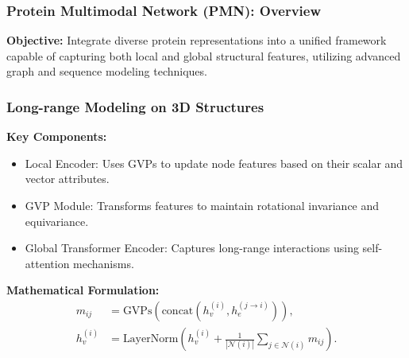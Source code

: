 \documentclass[11pt,xcolor={dvipsnames},hyperref={pdftex,pdfpagemode=UseNone,hidelinks,pdfdisplaydoctitle=true},usepdftitle=false]{beamer}
\begin{document}
\begin{frame}
    \frametitle{Protein Multimodal Network (PMN): Overview}
    \textbf{Objective:} Integrate diverse protein representations into a unified framework capable of capturing both local and global structural features, utilizing advanced graph and sequence modeling techniques.
    
    
\end{frame}

\begin{frame}
\frametitle{Long-range Modeling on 3D Structures}
\textbf{Key Components:}
\begin{itemize}
    \item Local Encoder: Uses GVPs to update node features based on their scalar and vector attributes.
    \item GVP Module: Transforms features to maintain rotational invariance and equivariance.
    \item Global Transformer Encoder: Captures long-range interactions using self-attention mechanisms.
\end{itemize}

\textbf{Mathematical Formulation:}
\begin{align*}
    m_{ij} &= \text{GVPs}\left(\text{concat}(h_v^{(i)}, h_e^{(j \rightarrow i)})\right), \\
    h_v^{(i)} &= \text{LayerNorm}\left(h_v^{(i)} + \frac{1}{|\mathcal{N}(i)|}\sum_{j \in \mathcal{N}(i)} m_{ij}\right).
\end{align*}

\end{frame}
\end{document}
